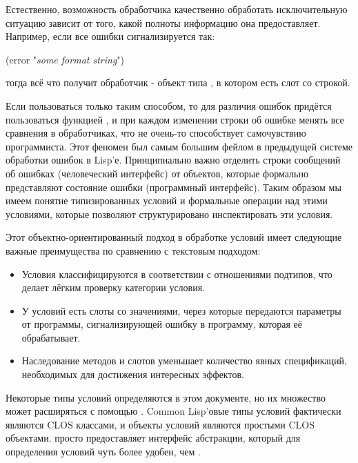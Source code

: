 Естественно, возможность обработчика качественно обработать исключительную
ситуацию зависит от того, какой полноты информацию она предоставляет. Например,
если все ошибки сигнализируется так:
\begin{lisp}
(error "\emph{some format string}")
\end{lisp}
тогда всё что получит обработчик - объект типа , в котором
есть слот со строкой.

Если пользоваться только таким способом, то для различия ошибок придётся
пользоваться функцией , и при каждом изменении строки об
ошибке менять все сравнения в обработчиках, что не очень-то способствует
самочувствию программиста. Этот феномен был самым большим фейлом в предыдущей
системе обработки ошибок в Lisp'е.  Принципиально важно отделить строки
сообщений об ошибках (человеческий интерфейс) от объектов, которые формально
представляют состояние ошибки (программный интерфейс). Таким образом мы имеем
понятие типизированных условий и формальные операции над этими условиями,
которые позволяют структурировано инспектировать эти условия.

Этот объектно-ориентированный подход в обработке условий имеет следующие
важные преимущества по сравнению с текстовым подходом:
\begin{itemize}
\item Условия классифицируются в соответствии с отношениями подтипов, что делает
  лёгким проверку категории условия.

\item У условий есть слоты со значениями, через которые передаются параметры от
  программы, сигнализирующей ошибку в программу, которая её обрабатывает.

\item Наследование методов и слотов уменьшает количество явных спецификаций,
  необходимых для достижения интересных эффектов.
\end{itemize}

Некоторые типы условий определяются в этом документе, но их множество может
расширяться с помощью .
Common Lisp'овые типы условий фактически являются CLOS классами, и объекты
условий являются простыми CLOS объектами.  просто
предоставляет интерфейс абстракции, который для определения условий чуть более
удобен, чем .

